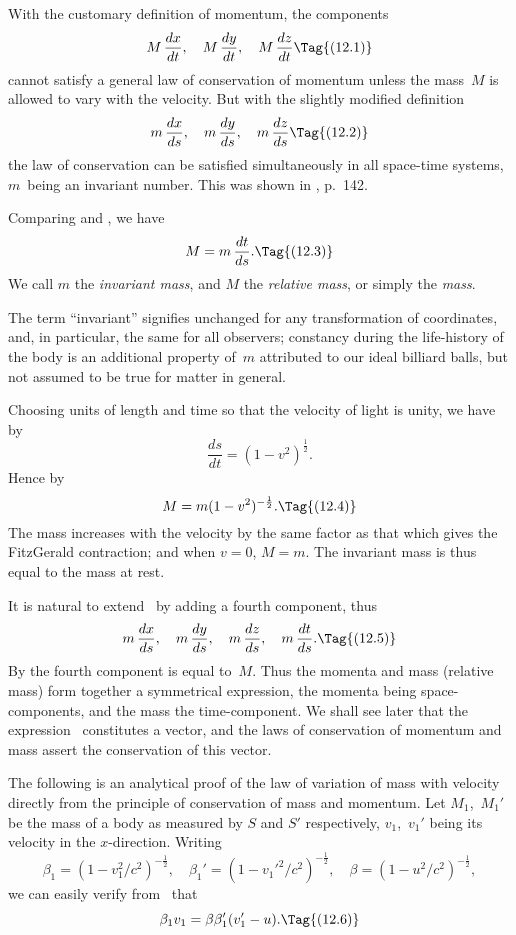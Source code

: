 \documentclass[12pt]{book}
\begin{document}
With the customary definition of momentum, the components
\[
M\, \frac{dx}{dt},\quad
M\, \frac{dy}{dt},\quad
M\, \frac{dz}{dt}
\Tag{(12.1)}
\]
cannot satisfy a general law of conservation of momentum unless the mass~$M$
%
is allowed to vary with the velocity. But with the slightly modified definition
\[
m\, \frac{dx}{ds},\quad
m\, \frac{dy}{ds},\quad
m\, \frac{dz}{ds}
\Tag{(12.2)}
\]
the law of conservation can be satisfied simultaneously in all space-time
systems, $m$~being an invariant number. This was shown in , p.~142.

Comparing  and , we have
\[
M = m\, \frac{dt}{ds}.
\Tag{(12.3)}
\]
We call $m$ the \emph{invariant mass}, and $M$ the \emph{relative mass}, or simply the \emph{mass}.

The term ``invariant'' signifies unchanged for any transformation of
coordinates, and, in particular, the same for all observers; constancy during
the life-history of the body is an additional property of~$m$ attributed to our
ideal billiard balls, but not assumed to be true for matter in general.

Choosing units of length and time so that the velocity of light is unity,
we have by~
\[
\frac{ds}{dt} = (1 - v^{2})^{\frac{1}{2}}.
\]
Hence by 
\[
M = m(1 - v^{2})^{-\frac{1}{2}}.
\Tag{(12.4)}
\]
The mass increases with the velocity by the same factor as that which gives
the FitzGerald contraction; and when $v = 0$, $M = m$. The invariant mass is
thus equal to the mass at rest.

It is natural to extend~ by adding a fourth component, thus
\[
m\, \frac{dx}{ds},\quad
m\, \frac{dy}{ds},\quad
m\, \frac{dz}{ds},\quad
m\, \frac{dt}{ds}.
\Tag{(12.5)}
\]
By  the fourth component is equal to~$M$. Thus the momenta and mass
(relative mass) form together a symmetrical expression, the momenta being
space-components, and the mass the time-component. We shall see later that
the expression~ constitutes a vector, and the laws of conservation of
momentum and mass assert the conservation of this vector.

The following is an analytical proof of the law of variation of mass with
velocity directly from the principle of conservation of mass and momentum.
Let $M_{1}$,~$M_{1}'$ be the mass of a body as measured by $S$ and $S'$ respectively,
$v_{1}$,~$v_{1}'$ being its velocity in the $x$-direction. Writing
\[
\beta_{1} = (1 - v_{1}^{2}/c^{2})^{-\frac{1}{2}},\quad
\beta_{1}' = (1 - v_{1}'^{2}/c^{2})^{-\frac{1}{2}},\quad
\beta = (1 - u^{2}/c^{2})^{-\frac{1}{2}},
\]
we can easily verify from~ that
\[
\beta_{1}v_{1} = \beta\beta_{1}'(v_{1}' - u).
\Tag{(12.6)}
\]
\end{document}
